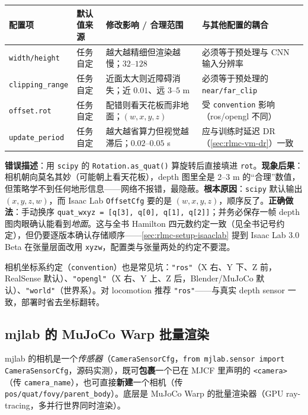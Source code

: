 \begin{center}
\small
\begin{tabular}{@{}p{2.6cm}p{2.4cm}p{3.0cm}p{3.4cm}@{}}
\toprule
配置项 & 默认值来源 & 修改影响 / 合理范围 & 与其他配置的耦合 \\
\midrule
\verb|width/height| & 任务自定 & 越大越精细但渲染越慢；$32$--$128$ & 必须等于预处理与 CNN 输入分辨率 \\
\verb|clipping_range| & 任务自定 & 近面太大则近障碍消失；近 $0.01$、远 $3$--$5$ m & 必须等于预处理的 \verb|near/far_clip| \\
\verb|offset.rot| & 任务自定 & 配错则看天花板而非地面；$(w,x,y,z)$ & 受 \verb|convention| 影响（ros/opengl 不同） \\
\verb|update_period| & 任务自定 & 越大越省算力但视觉越滞后；$0.02$--$0.05$ s & 应与训练时延迟 DR（\cref{sec:rlmc-vm-dr}）一致 \\
\bottomrule
\end{tabular}
\end{center}

\begin{pitfall}
\textbf{错误描述}：用 \verb|scipy| 的 \verb|Rotation.as_quat()| 算旋转后直接填进 \verb|rot|。\textbf{现象后果}：相机朝向莫名其妙（可能朝上看天花板），depth 图里全是 $2$--$3$ m 的“合理”数值，但策略学不到任何地形信息——网络不报错，最隐蔽。\textbf{根本原因}：\verb|scipy| 默认输出 $(x,y,z,w)$，而 Isaac Lab \verb|OffsetCfg| 要的是 $(w,x,y,z)$，顺序反了。\textbf{正确做法}：手动换序 \verb|quat_wxyz = [q[3], q[0], q[1], q[2]]|；并务必保存一帧 depth 图肉眼确认能看到\emph{地面}。这与全书 Hamilton 四元数约定一致（见全书记号约定），但仍要逐版本确认存储顺序——\cref{sec:rlmc-setup-isaaclab} 提到 Isaac Lab 3.0 Beta 在张量层面改用 \verb|xyzw|，配置类与张量两处的约定不要混。
\end{pitfall}

相机坐标系约定（\verb|convention|）也是常见坑：\verb|"ros"|（X 右、Y 下、Z 前，RealSense 默认）、\verb|"opengl"|（X 右、Y 上、Z 后，Blender/MuJoCo 默认）、\verb|"world"|（世界系）。对 locomotion 推荐 \verb|"ros"|——与真实 depth sensor 一致，部署时省去坐标翻转。

\subsection{mjlab 的 MuJoCo Warp 批量渲染}
\label{sec:rlmc-vm-mjlabcam}

mjlab 的相机是一个\emph{传感器}（\verb|CameraSensorCfg|，\verb|from mjlab.sensor import CameraSensorCfg|，源码实测），既可\textbf{包裹}一个已在 MJCF 里声明的 \verb|<camera>|（传 \verb|camera_name|），也可直接\textbf{新建}一个相机（传 \verb|pos/quat/fovy/parent_body|）。底层是 MuJoCo Warp 的批量渲染器（GPU ray-tracing，多并行世界同时渲染）。

